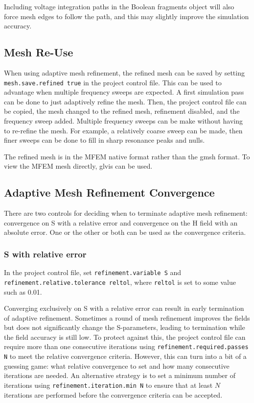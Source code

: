 \documentclass[titlepage]{article}
\renewcommand\_{\textunderscore\linebreak[1]}
\begin{document}
Including voltage integration paths in the Boolean fragments object will also force mesh edges to follow the path, and this may slightly improve the simulation accuracy.

\subsection{Mesh Re-Use}

When using adaptive mesh refinement, the refined mesh can be saved by setting \texttt{mesh.save.refined true} in the project control file.  This can be used to advantage when multiple frequency sweeps are expected.  A first simulation pass can be done to just adaptively refine the mesh.  Then, the project control file can be copied, the mesh changed to the refined mesh, refinement disabled, and the frequency sweep added.  Multiple frequency sweeps can be make without having to re-refine the mesh.  For example, a relatively coarse sweep can be made, then finer sweeps can be done to fill in sharp resonance peaks and nulls.

The refined mesh is in the MFEM native format rather than the gmsh format.  To view the MFEM mesh directly, glvis can be used.

\subsection{Adaptive Mesh Refinement Convergence}

There are two controls for deciding when to terminate adaptive mesh refinement: convergence on S with a relative error and convergence on the H field with an absolute error.  One or the other or both can be used as the convergence criteria.

\subsubsection{S with relative error}

In the project control file, set \texttt{refinement.variable S} and \texttt{refinement.relative.tolerance reltol}, where \texttt{reltol} is set to some value such as 0.01.

Converging exclusively on S with a relative error can result in early termination of adaptive refinement.  Sometimes a round of mesh refinement improves the fields but does not significantly change the S-parameters, leading to termination while the field accuracy is still low.  To protect against this, the project control file can require more than one consecutive iterations using \texttt{refinement.required.passes N} to meet the relative convergence criteria.  However, this can turn into a bit of a guessing game: what relative convergence to set and how many consecutive iterations are needed.  An alternative strategy is to set a minimum number of iterations using \texttt{refinement.iteration.min N} to ensure that at least $N$ iterations are performed before the convergence criteria can be accepted.
\end{document}
